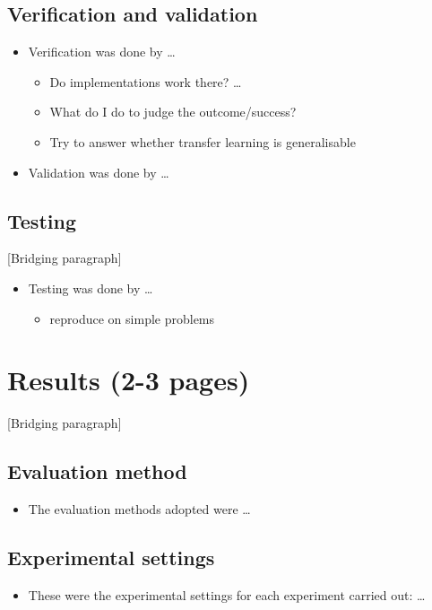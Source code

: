 \documentclass[12pt,a4paper]{article}
\begin{document}
\subsection{Verification and validation}
\begin{itemize}
    \item Verification was done by \dots 
    \begin{itemize}
        \item Do implementations work there? \dots 
        \item What do I do to judge the outcome/success?
        \item Try to answer whether transfer learning is generalisable 
    \end{itemize}
    \item Validation was done by \dots
\end{itemize}

\subsection{Testing}
[Bridging paragraph]
\begin{itemize}
    \item Testing was done by \dots
    \begin{itemize}
        \item reproduce on simple problems
    \end{itemize}
\end{itemize}

\section{Results (2-3 pages)}
[Bridging paragraph]
\subsection{Evaluation method}
\begin{itemize}
    \item The evaluation methods adopted were \dots
\end{itemize}

\subsection{Experimental settings}
\begin{itemize}
    \item These were the experimental settings for each experiment carried out: \dots
\end{itemize}
\end{document}
